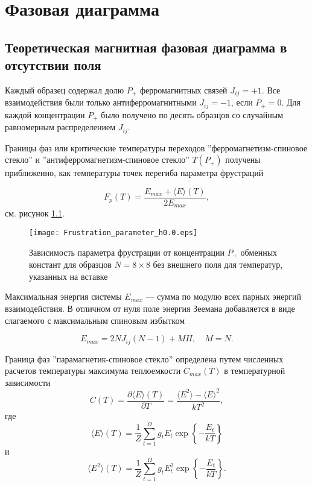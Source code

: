 \chapter{Фазовая диаграмма}\label{ch:ch3}

\section{Теоретическая магнитная фазовая диаграмма в отсутствии поля} Каждый образец содержал долю $P_{+}$ ферромагнитных связей  $J_{ij}=+1$. Все взаимодействия были только антиферромагнитными $J_{ij}=-1$, если $P_{+}=0$. Для каждой концентрации $P_{+}$ было получено по десять образцов со случайным равномерным распределением $J_{ij}$. 

Границы фаз или критические температуры переходов ''ферромагнетизм-спиновое стекло''  и ''антиферромагнетизм-спиновое стекло'' $T(P_{+})$ получены приближенно, как температуры точек перегиба параметра фрустраций \cite{makarov2019} 

\begin{equation}
	F_p(T) = \frac{E_{max} + \langle E \rangle (T)}{2E_{max}},
	\label{eq:frustration_parameter}
\end{equation}
см. рисунок \ref{fig:fp0}. 

\begin{figure}[!ht]
	\centering
	\texttt{[image: Frustration\_parameter\_h0.0.eps]}
	\caption{Зависимость параметра фрустрации от концентрации $P_{+}$ обменных констант для образцов $N=8\times8$ без внешнего поля для температур, указанных на вставке}
	\label{fig:fp0}
\end{figure}

Максимальная энергия системы $E_{max}$ --- сумма по модулю всех парных энергий взаимодействия. В отличном от нуля поле энергия Зеемана добавляется в виде слагаемого с максимальным спиновым избытком

\begin{equation}
	E_{max} = 2NJ_{ij}(N-1) + MH, \quad M = N.
	\label{eq:Emax}
\end{equation}

Граница фаз ''парамагнетик-спиновое стекло'' определена путем численных расчетов температуры максимума теплоемкости $C_{max}(T)$ в температурной зависимости
\begin{equation}
	C(T)=\frac{\partial \langle E \rangle (T)}{\partial T}=\frac{\langle E^2 \rangle-\langle E \rangle ^2}{k T^2},
	\label{eq:ct}
\end{equation}
где
\begin{equation}
	\langle E \rangle (T) =\frac{1}{Z}\sum_{t=1}^{\Omega}g_t E_t \exp\left\{-\frac{E_t}{kT}\right\}
	\label{eq:ct}
\end{equation}
и
\begin{equation}
	\langle E^2 \rangle (T) =\frac{1}{Z}\sum_{t=1}^{\Omega}g_t E_t^2 \exp\left\{-\frac{E_t}{kT}\right\}.
	\label{eq:ct}
\end{equation}

